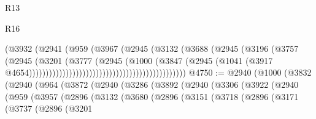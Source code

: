 \begin{lexlean}{R13}
\begin{lexlean}{R16}
\begin{coremodule}
{{{{{{{{{{{{{{{{{{{{{{{{{{{{{{{{{{{{{{{{{{{{{{{{{{{{{{{{{{{{{{{{{{{{{{{{{{{{{{{{{{{{{{{{{{{{{{{{{{{{{{{{{{{{{{{{{                                                            (@3932
                                                              (@2941
                                                                (@959
                                                                  (@3967
                                                                    (@2945
                                                                      (@3132
                                                                        (@3688
                                                                          (@2945
                                                                            (@3196
                                                                              (@3757
                                                                                (@2945
                                                                                  (@3201
                                                                                    (@3777
                                                                                      (@2945
                                                                                        (@1000
                                                                                          (@3847
                                                                                            (@2945
                                                                                              (@1041
                                                                                                (@3917
                                                                                                  @4654)))))))))))))))))))))))))))))))))))))))))))))))
@4750 := @2940
    (@1000
      (@3832
        (@2940
          (@964
            (@3872
              (@2940
                (@3286
                  (@3892
                    (@2940
                      (@3306
                        (@3922
                          (@2940
                            (@959
                              (@3957
                                (@2896
                                  (@3132
                                    (@3680
                                      (@2896
                                        (@3151
                                          (@3718
                                            (@2896
                                              (@3171
                                                (@3737
                                                  (@2896
                                                    (@3201
}}}}}}}}}}}}}}}}}}}}}}}}}}}}}}}}}}}}}}}}}}}}}}}}}}}}}}}}}}}}}}}}}}}}}}}}}}}}}}}}}}}}}}}}}}}}}}}}}}}}}}}}}}}}}}}}}
\end{coremodule}
\end{lexlean}
\end{lexlean}
